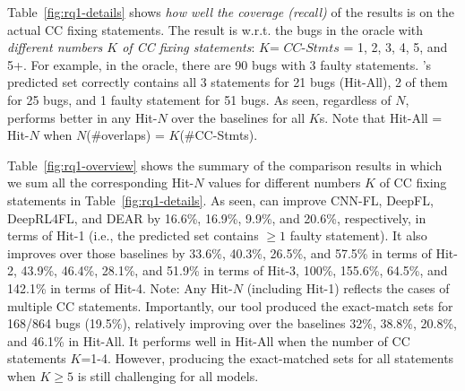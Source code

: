 Table~\ref{fig:rq1-details} shows {\em how well the coverage (recall)} of
the results is on the actual CC fixing statements. The result is
w.r.t. the bugs in the oracle with {\em different numbers $K$ of CC
fixing statements}: $K$= $CC$-$Stmts$ = 1, 2, 3, 4, 5, and 5+. For
example, in the oracle, there are 90 bugs with 3 faulty
statements. {\tool}'s predicted set correctly contains all 3
statements for 21 bugs (Hit-All), 2 of them for 25 bugs, and 1 faulty
statement for 51 bugs. As seen, regardless of $N$, {\tool} performs
better in any Hit-$N$ over the baselines for all $K$s. Note that
Hit-All = Hit-$N$ when $N$(\#overlaps) = $K$(\#CC-Stmts).



Table~\ref{fig:rq1-overview} shows the summary of the comparison
results in which we sum all the corresponding Hit-$N$ values for
different numbers $K$ of CC fixing statements in
Table~\ref{fig:rq1-details}.
%
As seen, {\tool} can improve CNN-FL, DeepFL, DeepRL4FL, and DEAR
by 16.6\%, 16.9\%, 9.9\%, and 20.6\%, respectively, in terms of
Hit-1 (i.e., the predicted set contains $\geq 1$ faulty statement).
%
%
It also improves over those baselines by 33.6\%, 40.3\%, 26.5\%,
and 57.5\% in terms of Hit-2, 43.9\%, 46.4\%, 28.1\%, and 
51.9\% in terms of Hit-3, 100\%, 155.6\%, 64.5\%, and 142.1\% in
terms of Hit-4. Note: Any Hit-$N$ (including Hit-1) reflects
the cases of multiple CC statements.
%
Importantly, our tool produced the exact-match sets for 168/864 bugs
(19.5\%), relatively improving over the baselines 32\%, 38.8\%,
20.8\%, and 46.1\% in Hit-All. It performs well in Hit-All
when the number of CC statements $K$=1-4. However, producing the
exact-matched sets for all statements when $K \geq 5$ is still
challenging for all models.


